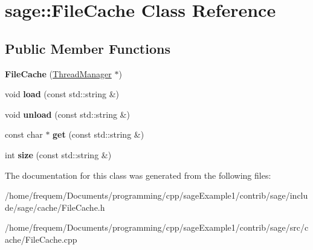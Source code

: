 \hypertarget{classsage_1_1FileCache}{}\section{sage\+::File\+Cache Class Reference}
\label{classsage_1_1FileCache}
\subsection*{Public Member Functions}
\begin{DoxyCompactItemize}
\item 
\mbox{\label{classsage_1_1FileCache_a678b0c55787f0f2459c49a94b5bac8e7}} 
{\bfseries File\+Cache} (\mbox{\hyperlink{classsage_1_1ThreadManager}{Thread\+Manager}} $\ast$)
\item 
\mbox{\label{classsage_1_1FileCache_a1001e01d9aee8f2fa16365ae2504934f}} 
void {\bfseries load} (const std\+::string \&)
\item 
\mbox{\label{classsage_1_1FileCache_a2af60ae582c2c6a40ebe37803137d5e7}} 
void {\bfseries unload} (const std\+::string \&)
\item 
\mbox{\label{classsage_1_1FileCache_a412d3f6c3a25435ff9d19d609dc9f24f}} 
const char $\ast$ {\bfseries get} (const std\+::string \&)
\item 
\mbox{\label{classsage_1_1FileCache_a369b86f1fb585e5ce5142a7f1f22e38c}} 
int {\bfseries size} (const std\+::string \&)
\end{DoxyCompactItemize}


The documentation for this class was generated from the following files\+:\begin{DoxyCompactItemize}
\item 
/home/frequem/\+Documents/programming/cpp/sage\+Example1/contrib/sage/include/sage/cache/File\+Cache.\+h\item 
/home/frequem/\+Documents/programming/cpp/sage\+Example1/contrib/sage/src/cache/File\+Cache.\+cpp\end{DoxyCompactItemize}
